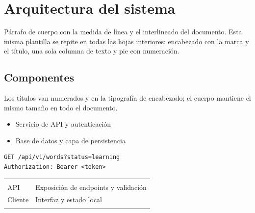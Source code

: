 \documentclass[letterpaper]{wordglow}   %
\begin{document}
\maketitle

\wgindice
\clearpage
{}

\section{Arquitectura del sistema}

P\'arrafo de cuerpo con la medida de l\'inea y el interlineado del documento.
Esta misma plantilla se repite en todas las hojas interiores: encabezado con
la marca y el t\'itulo, una sola columna de texto y pie con numeraci\'on.

\subsection{Componentes}

Los t\'itulos van numerados y en la tipograf\'ia de encabezado; el cuerpo
mantiene el mismo tama\~no en todo el documento.

\begin{itemize}
  \item Servicio de API y autenticaci\'on
  \item Base de datos y capa de persistencia
\end{itemize}

\begin{lstlisting}
GET /api/v1/words?status=learning
Authorization: Bearer <token>
\end{lstlisting}

\vskip13.5pt
\noindent\small
\begin{tabular}{@{}L{2.6in}L{3.7in}@{}}
 & \\
\wgtoprule
API & Exposici\'on de endpoints y validaci\'on\\
\wgrowrule
Cliente & Interfaz y estado local\\
\wgrowrule
\end{tabular}
\par\normalsize\vskip13.5pt

\end{document}
